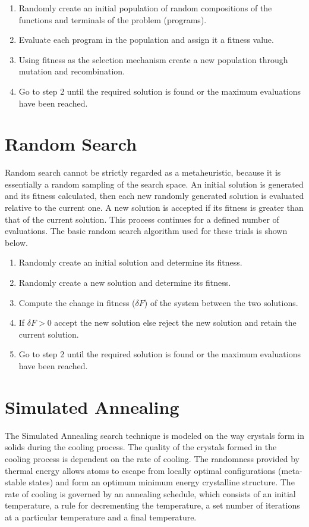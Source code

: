 \begin{center}
\begin{enumerate}
\item Randomly create an initial population of random compositions of the functions and terminals of the problem (programs).
\item  Evaluate each program in the population and assign it a fitness value. 
\item Using fitness as the selection mechanism create a new population through mutation and recombination.
\item Go to step 2 until the required solution is found or the maximum evaluations have been reached. 
\end{enumerate}
\end{center}

\section{Random Search}
Random search cannot be strictly regarded as a metaheuristic, because it is essentially a random sampling of the search space. An initial solution is generated and its fitness calculated, then each new randomly generated solution is evaluated relative to the current one.  A new solution is accepted if its fitness is greater than that of the current solution. This process continues for a defined number of evaluations. The basic random search algorithm used for these trials is shown below.

\begin{center}
\begin{enumerate}
\item Randomly create an initial solution and determine its fitness. 
\item Randomly create a new solution and determine its fitness. 
\item Compute the change in fitness ($\delta F$) of the system between the two solutions. 
\item If $\delta F > 0 $ accept the new solution else reject the new solution and retain the current solution. 
\item Go to step 2 until the required solution is found or the maximum evaluations have been reached. 
\end{enumerate}
\end{center}

\section{Simulated Annealing}
The Simulated Annealing search technique is modeled on the way crystals form in solids during the cooling process. The quality of the crystals formed in the cooling process is dependent on the rate of cooling. The randomness provided by thermal energy allows atoms to escape from locally optimal configurations (meta-stable states) and form an optimum minimum energy crystalline structure.
\label{schedule}The rate of cooling is governed by an annealing schedule, which consists of an initial temperature, a rule for decrementing the temperature, a set number of iterations at a particular temperature and a final temperature.


